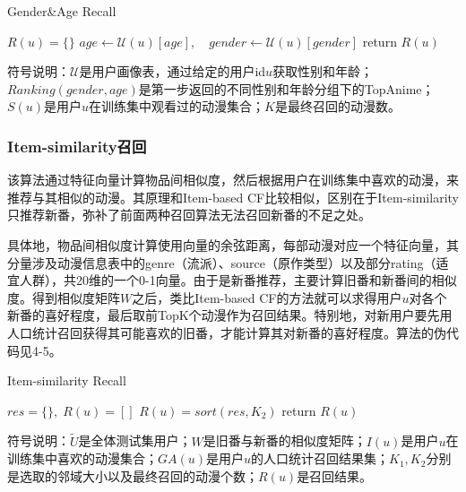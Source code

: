       \begin{algorithm}[htbp]
        \caption{Gender\&Age Recall}
        $R(u)=\{\}$\;
        $age\leftarrow \mathcal{U}(u)[age],\quad gender\leftarrow \mathcal{U}(u)[gender]$\;
        return $R(u)$\;
      \end{algorithm}

      符号说明：$\mathcal{U}$是用户画像表，通过给定的用户id$u$获取性别和年龄；$Ranking(gender,age)$是第一步返回的不同性别和年龄分组下的TopAnime；$S(u)$是用户$u$在训练集中观看过的动漫集合；$K$是最终召回的动漫数。

      \subsubsection{Item-similarity召回}
      该算法通过特征向量计算物品间相似度，然后根据用户在训练集中喜欢的动漫，来推荐与其相似的动漫。其原理和Item-based CF比较相似，区别在于Item-similarity只推荐新番，弥补了前面两种召回算法无法召回新番的不足之处。

      具体地，物品间相似度计算使用向量的余弦距离，每部动漫对应一个特征向量，其分量涉及动漫信息表中的genre（流派）、source（原作类型）以及部分rating（适宜人群），共20维的一个0-1向量。由于是新番推荐，主要计算旧番和新番间的相似度。得到相似度矩阵$W$之后，类比Item-based CF的方法就可以求得用户$u$对各个新番的喜好程度，最后取前TopK个动漫作为召回结果。特别地，对新用户要先用人口统计召回获得其可能喜欢的旧番，才能计算其对新番的喜好程度。算法的伪代码见4-5。
      \begin{algorithm}
        \caption{Item-similarity Recall}
        $res=\{\},\;R(u)=[]$\;
        $R(u)=sort(res,K_2)$\;
        return $R(u)$\;
      \end{algorithm}
      符号说明：$\tilde{U}$是全体测试集用户；$W$是旧番与新番的相似度矩阵；$I(u)$是用户$u$在训练集中喜欢的动漫集合；$GA(u)$是用户$u$的人口统计召回结果集；$K_1,K_2$分别是选取的邻域大小以及最终召回的动漫个数；$R(u)$是召回结果。

